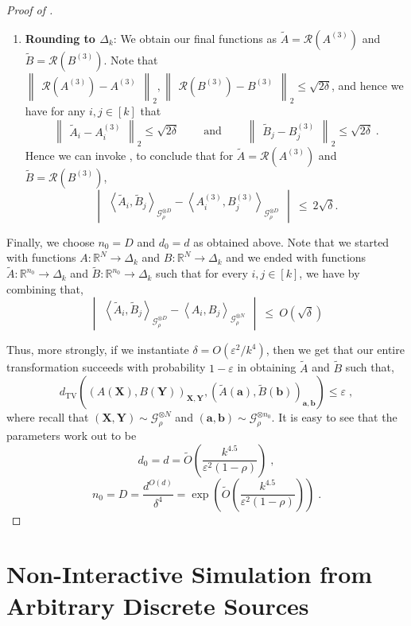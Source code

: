 \documentclass[11pt]{article}
\newcommand{\inparen}[1]{\left ( #1 \right )}
\newcommand{\inangle}[1]{\left \langle #1 \right \rangle}
\newcommand{\inabs}[1]{\begin{vmatrix} #1 \end{vmatrix}}
\newcommand{\norm}[2]{\begin{Vmatrix} #2 \end{Vmatrix}_{#1}}
\newcommand{\sAND}{\ \mathrm{and} \ }
\newcommand{\wtilde}[1]{\widetilde{#1}}
\newcommand{\dTV}{d_{\mathrm{TV}}}
\newcommand{\eps}{\varepsilon}
\newcommand{\bbR}{{\mathbb R}}
\newcommand{\ba}{{\bm a}}
\newcommand{\bb}{{\bm b}}
\newcommand{\bX}{\mathbf{X}}
\newcommand{\bY}{\mathbf{Y}}
\newcommand{\calG}{\mathcal{G}}
\newcommand{\calR}{\mathcal{R}}
\begin{document}
\begin{proof}[Proof of ]
\begin{enumerate}
	\item {\bf Rounding to $\Delta_k$}: We obtain our final functions as $\wtilde{A} = \calR(A^{(3)})$ and $\wtilde{B} = \calR(B^{(3)})$. %
	Note that $\norm{2}{\calR(A^{(3)}) - A^{(3)}}, \norm{2}{\calR(B^{(3)}) - B^{(3)}} \le \sqrt{2\delta}$, and hence we have for any $i, j \in [k]$ that \[\norm{2}{\wtilde{A}_i - A_i^{(3)}} \le \sqrt{2 \delta} \qquad \sAND \qquad \norm{2}{\wtilde{B}_j - B_j^{(3)}} \le \sqrt{2\delta}\;.\]
	Hence we can invoke , to conclude that for $\wtilde{A} = \calR(A^{(3)})$ and $\wtilde{B} = \calR(B^{(3)})$,
	\begin{equation}
	\inabs{\inangle{\wtilde{A}_i, \wtilde{B}_j}_{\calG_\rho^{\otimes D}} - \inangle{A^{(3)}_i, B^{(3)}_j}_{\calG_\rho^{\otimes D}}} ~\le~ 2 \sqrt{\delta}. \label{eqn:GNIS-4}
	\end{equation}
\end{enumerate}

\noindent Finally, we choose $n_0 = D$ and $d_0 = d$ as obtained above. Note that we started with functions $A: \bbR^N \to \Delta_k$ and $B : \bbR^N \to \Delta_k$ and we ended with functions $\wtilde{A} : \bbR^{n_0} \to \Delta_k$ and $\wtilde{B} : \bbR^{n_0} \to \Delta_k$ such that for every $i, j \in [k]$, we have by combining  that,
\[ \inabs{\inangle{\wtilde{A}_i, \wtilde{B}_j}_{\calG_\rho^{\otimes D}} - \inangle{A_i, B_j}_{\calG_\rho^{\otimes N}}} ~\le~ O(\sqrt{\delta})\]

\noindent Thus, more strongly, if we instantiate $\delta = O(\eps^2/k^4)$, then we get that our entire transformation succeeds with probability $1-\eps$ in obtaining $\wtilde{A}$ and $\wtilde{B}$ such that,
\[\dTV((A(\bX),B(\bY))_{\bX,\bY}, (\wtilde{A}(\ba), \wtilde{B}(\bb))_{\ba, \bb}) \le \eps\;,\]
where recall that $(\bX, \bY) \sim \calG_\rho^{\otimes N}$ and $(\ba, \bb) \sim \calG_\rho^{\otimes n_0}$. It is easy to see that the parameters work out to be
\[ d_0 = d = \wtilde{O}\inparen{\frac{k^{4.5}}{\eps^2 (1-\rho)}}\;, \]
\[ n_0 = D = \frac{d^{O(d)}}{\delta^4} = \exp\inparen{\wtilde{O}\inparen{\frac{k^{4.5}}{\eps^2 (1-\rho)}}}\;.\]
\end{proof}%

\section{Non-Interactive Simulation from Arbitrary Discrete Sources} \label{sec:non-int-sim}
\end{document}
